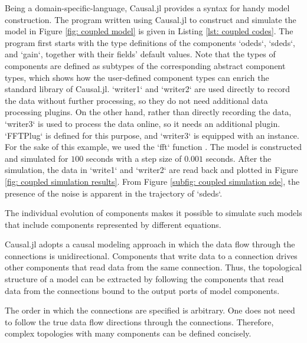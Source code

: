 Being a domain-specific-language, Causal.jl provides a syntax for handy model construction. The program written using Causal.jl to construct and simulate the model in Figure \ref{fig: coupled model} is given in Listing \ref{lst: coupled codes}. The program first starts with the type definitions of the components `odeds`, `sdeds`, and `gain`, together with their fields' default values. Note that the types of components are defined as subtypes of the corresponding abstract component types, which shows how the user-defined component types can enrich the standard library of Causal.jl. `writer1` and `writer2` are used directly to record the data without further processing, so they do not need additional data processing plugins.
On the other hand, rather than directly recording the data, `writer3` is used to process the data online, so it needs an additional plugin. `FFTPlug` is defined for this purpose, and `writer3` is equipped with an instance. For the sake of this example, we used the `fft` function \cite{fftw}. The model is constructed and simulated for $100$ seconds with a step size of $0.001$ seconds. After the simulation, the data in `write1` and `writer2` are read back and plotted in Figure \ref{fig: coupled simulation results}. From Figure \ref{subfig: coupled simulation sde}, the presence of the noise is apparent in the trajectory of `sdeds`. 

The individual evolution of components makes it possible to simulate such models that include components represented by different equations. 

Causal.jl adopts a causal modeling approach in which the data flow through the connections is unidirectional. Components that write data to a connection drives other components that read data from the same connection. Thus, the topological structure of a model can be extracted by following the components that read data from the connections bound to the output ports of model components.

The order in which the connections are specified is arbitrary. One does not need to follow the true data flow directions through the connections. Therefore, complex topologies with many components can be defined concisely.

